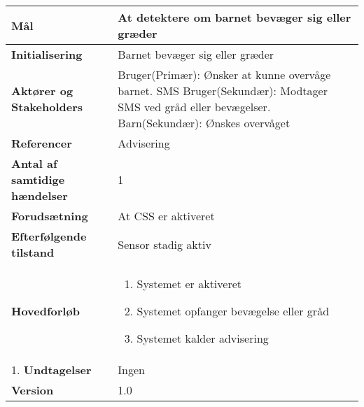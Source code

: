\begin{table}[H] \centering
\begin{tabular}{|p{6cm}|p{8cm}|}
	\hline
\textbf{Mål}								&At detektere om barnet bevæger sig eller græder \\\hline
\textbf{Initialisering}					&Barnet bevæger sig eller græder\\\hline
\textbf{Aktører og Stakeholders}			&Bruger(Primær): Ønsker at kunne overvåge barnet. SMS Bruger(Sekundær): 																	Modtager SMS ved gråd eller bevægelser. Barn(Sekundær): Ønskes overvåget 				 \\\hline
\textbf{Referencer}						&Advisering \\\hline
\textbf{Antal af samtidige hændelser}	&1 \\\hline
\textbf{Forudsætning}					&At CSS er aktiveret \\\hline
\textbf{Efterfølgende tilstand}			&Sensor stadig aktiv \\\hline
\textbf{Hovedforløb}						&\begin{enumerate}
	
				\item Systemet er aktiveret
												
				\item Systemet opfanger bevægelse eller gråd
												
				\item Systemet kalder advisering
								
			\end{enumerate}\\\hline1.
\textbf{Undtagelser}					&Ingen \\\hline
		\textbf{Version}		&1.0 \\\hline
	\end{tabular}
	\label{UC5} 
\end{table}

